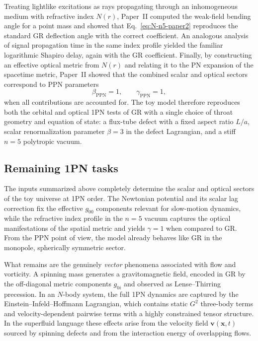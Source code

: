 \documentclass[11pt]{article}
\begin{document}
Treating lightlike excitations as rays propagating through an
inhomogeneous medium with refractive index $N(r)$, Paper~II computed
the weak-field bending angle for a point mass and showed that
Eq.~\eqref{eq:N-n5-paper2} reproduces the standard GR deflection
angle with the correct coefficient.
An analogous analysis of signal propagation time in the same index
profile yielded the familiar logarithmic Shapiro delay, again with
the GR coefficient.
Finally, by constructing an effective optical metric from $N(r)$ and
relating it to the PN expansion of the spacetime metric, Paper~II
showed that the combined scalar and optical sectors correspond to
PPN parameters
\begin{equation}
  \beta_{\mathrm{PPN}} = 1,
  \qquad
  \gamma_{\mathrm{PPN}} = 1,
\end{equation}
when all contributions are accounted for.
The toy model therefore reproduces both the orbital and optical 1PN
tests of GR with a single choice of throat geometry and equation of
state: a flux-tube defect with a fixed aspect ratio $L/a$, scalar
renormalization parameter $\beta=3$ in the defect Lagrangian, and a
stiff $n=5$ polytropic vacuum.

\subsection{Remaining 1PN tasks}
\label{subsec:inputs-missing}

The inputs summarized above completely determine the scalar and
optical sectors of the toy universe at 1PN order.
The Newtonian potential and its scalar lag correction fix the
effective $g_{00}$ components relevant for slow-motion dynamics,
while the refractive index profile in the $n=5$ vacuum captures the
optical manifestations of the spatial metric and yields $\gamma=1$
when compared to GR.
From the PPN point of view, the model already behaves like GR in the
monopole, spherically symmetric sector.

What remains are the genuinely \emph{vector} phenomena associated
with flow and vorticity.
A spinning mass generates a gravitomagnetic field, encoded in GR by
the off-diagonal metric components $g_{0i}$ and observed as
Lense--Thirring precession.
In an $N$-body system, the full 1PN dynamics are captured by the
Einstein--Infeld--Hoffmann Lagrangian, which contains static $G^2$
three-body terms and velocity-dependent pairwise terms with a highly
constrained tensor structure.
In the superfluid language these effects arise from the velocity
field $\mathbf{v}(\mathbf{x},t)$ sourced by spinning defects and
from the interaction energy of overlapping flows.
\end{document}
